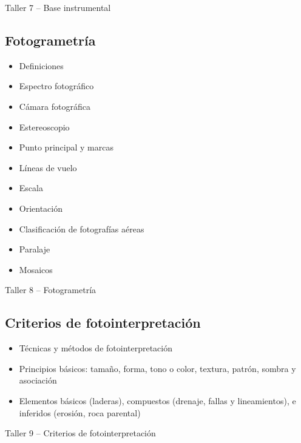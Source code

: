 \documentclass[a4paper,twoside,11pt,]{article}
\begin{document}
\begin{tcolorbox}[enhanced,width=5in,center upper,  fontupper=\large\bfseries,drop shadow southwest,sharp corners]
Taller 7 -- Base instrumental
\end{tcolorbox}

\subsection {Fotogrametría}
\begin{itemize}
\item Definiciones
\item Espectro fotográfico
\item Cámara fotográfica
\item Estereoscopio
\item Punto principal y marcas
\item Líneas de vuelo
\item Escala
\item Orientación
\item Clasificación de fotografías aéreas
\item Paralaje
\item Mosaicos
\end{itemize}

\begin{tcolorbox}[enhanced,width=5in,center upper,  fontupper=\large\bfseries,drop shadow southwest,sharp corners]
Taller 8 -- Fotogrametría
\end{tcolorbox}

\subsection {Criterios de fotointerpretación}
\begin{itemize}
\item Técnicas y métodos de fotointerpretación 
\item Principios básicos: tamaño, forma, tono o color, textura, patrón, sombra y asociación
\item Elementos básicos (laderas), compuestos (drenaje, fallas y lineamientos), e inferidos (erosión, roca parental)
\end{itemize}

\begin{tcolorbox}[enhanced,width=5in,center upper,  fontupper=\large\bfseries,drop shadow southwest,sharp corners]
Taller 9 -- Criterios de fotointerpretación
\end{tcolorbox}
\end{document}
